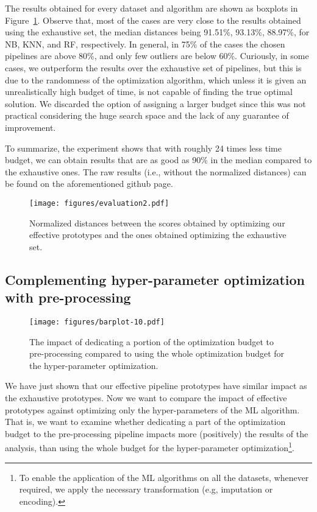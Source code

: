 The results obtained for every dataset and algorithm are shown as boxplots in Figure~\ref{fig:eval-exhaustive-vs-effective}. Observe that, most of the cases are very close to the results obtained using the exhaustive set, the median distances being 91.51\%, 93.13\%, 88.97\%, for NB, KNN, and RF, respectively. 
In general, in 75\% of the cases the chosen pipelines are above 80\%, and only few outliers are below 60\%. Curiously, in some cases, we outperform the results over the exhaustive set of pipelines, but this is due to the randomness of the optimization algorithm, which unless it is given an unrealistically high budget of time, is not capable of finding the true optimal solution. We discarded the option of assigning a larger budget since this was not practical considering the huge search space and the lack of any guarantee of improvement. 

To summarize, the experiment shows that with roughly 24 times less time budget, we can obtain results that are as good as 90\% in the median compared to the exhaustive ones. The raw results (i.e., without the normalized distances) can be found on the aforementioned github page.

\begin{figure}[!t]
    \centering
    \texttt{[image: figures/evaluation2.pdf]}
    \caption{Normalized distances between the scores obtained by optimizing our effective prototypes and the ones obtained optimizing the exhaustive set.}
    \label{fig:eval-exhaustive-vs-effective}
\end{figure}

\subsection{Complementing hyper-parameter optimization with pre-processing}
\label{sec:eval-dpso-vs-cash}

\begin{figure*}[!t]
	\centering
	\texttt{[image: figures/barplot-10.pdf]}
	\caption{The impact of dedicating a portion of the optimization budget to pre-processing compared to using the whole optimization budget for the hyper-parameter optimization.}
	\label{fig:eval-pre-processing-hyper-parameter}
\end{figure*}

We have just shown that our effective pipeline prototypes have similar impact as the exhaustive prototypes. Now we want to compare the impact of effective prototypes against optimizing only the hyper-parameters of the ML algorithm. That is, we want to examine whether dedicating a part of the optimization budget to the pre-processing pipeline impacts more (positively) the results of the analysis, than using the whole budget for the hyper-parameter optimization\footnote{To enable the application of the ML algorithms on all the datasets, whenever required, we apply the necessary transformation (e.g, imputation or encoding).}. 

